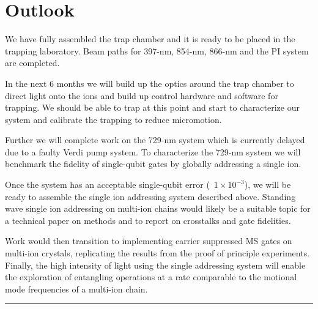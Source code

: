 \documentclass[12pt]{iopart}
\begin{document}

\section{Outlook}
We have fully assembled the trap chamber and it is ready to be placed
in the trapping laboratory.  Beam paths for 397-nm, 854-nm, 866-nm and
the PI system are completed.

In the next 6 months we will build up the optics around the trap
chamber to direct light onto the ions and build up control hardware
and software for trapping. We should be able to trap at this point and
start to characterize our system and calibrate the trapping to reduce
micromotion.

Further we will complete work on the 729-nm system which is currently
delayed due to a faulty Verdi pump system. To characterize the 729-nm
system we will benchmark the fidelity of single-qubit gates by
globally addressing a single ion.

Once the system has an acceptable single-qubit error
(~$1\times10^{-3}$), we will be ready to assemble the single ion
addressing system described above. Standing wave single ion addressing
on multi-ion chains would likely be a suitable topic for a technical
paper on methods and to report on crosstalks and gate fidelities.

Work would then transition to implementing carrier suppressed MS gates
on multi-ion crystals, replicating the results from the proof of
principle experiments. Finally, the high intensity of light using the
single addressing system will enable the exploration of entangling
operations at a rate comparable to the motional mode frequencies of a
multi-ion chain.

\vspace{2em}
\hrule
  
\end{document}
